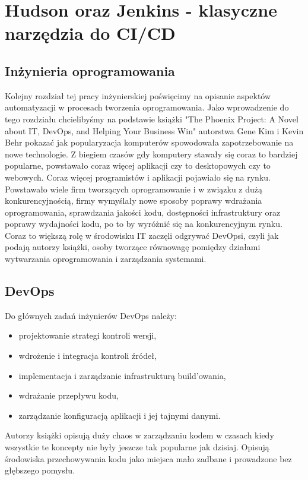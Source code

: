 \section{Hudson oraz Jenkins - klasyczne narzędzia do CI/CD}
\subsection{Inżynieria oprogramowania}
Kolejny rozdział tej pracy inżynierskiej poświęcimy na opisanie aspektów automatyzacji w procesach tworzenia oprogramowania. 
Jako wprowadzenie do tego rozdziału chcielibyśmy na podstawie książki "The Phoenix Project: A Novel about IT, DevOps, and Helping Your Business Win" autorstwa Gene Kim i Kevin Behr\cite{PhoenixProject} pokazać jak popularyzacja komputerów spowodowała zapotrzebowanie na nowe technologie. 
Z biegiem czasów gdy komputery stawały się coraz to bardziej popularne, powstawało coraz więcej aplikacji czy to desktopowych czy to webowych. Coraz więcej programistów i aplikacji pojawiało się na rynku. Powstawało wiele firm tworzących oprogramowanie i w związku z dużą konkurencyjnością, firmy wymyślały nowe sposoby poprawy wdrażania oprogramowania, sprawdzania jakości kodu, dostępności infrastruktury oraz poprawy wydajności kodu, po to by wyróżnić się na konkurencyjnym rynku. Coraz to większą rolę w środowisku IT zaczęli odgrywać  DevOpsi, czyli jak podają autorzy książki, osoby tworzące równowagę pomiędzy działami wytwarzania oprogramowania i zarządzania systemami.  


\subsection{DevOps} 
Do głównych zadań inżynierów DevOps należy:
\begin{itemize}
    \item projektowanie strategi kontroli wersji,
    \item wdrożenie i integracja kontroli źródeł,
    \item implementacja i zarządzanie infrastrukturą build'owania,
    \item wdrażanie przepływu kodu,
    \item zarządzanie konfiguracją aplikacji i jej tajnymi danymi.
\end{itemize}

Autorzy książki opisują duży chaos w zarządzaniu kodem w czasach kiedy wszystkie te koncepty nie były jeszcze tak popularne jak dzisiaj. Opisują środowiska przechowywania kodu jako miejsca mało zadbane i prowadzone bez głębszego pomysłu.

